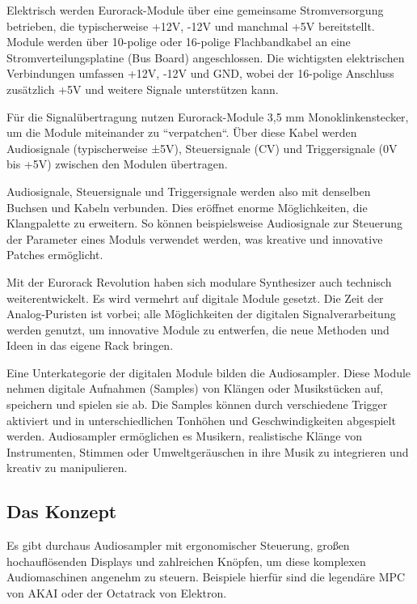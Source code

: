 	Elektrisch werden Eurorack-Module über eine gemeinsame Stromversorgung betrieben, die typischerweise +12V, -12V und manchmal +5V bereitstellt. Module werden über 10-polige oder 16-polige Flachbandkabel an eine Stromverteilungsplatine (Bus Board) angeschlossen. Die wichtigsten elektrischen Verbindungen umfassen +12V, -12V und GND, wobei der 16-polige Anschluss zusätzlich +5V und weitere Signale unterstützen kann. \cite{eurorack-standard}
	
	Für die Signalübertragung nutzen Eurorack-Module 3,5 mm Monoklinkenstecker, um die Module miteinander zu ``verpatchen``. Über diese Kabel werden Audiosignale (typischerweise ±5V), Steuersignale (CV) und Triggersignale (0V bis +5V) zwischen den Modulen übertragen.
	
	Audiosignale, Steuersignale und Triggersignale werden also mit denselben Buchsen und Kabeln verbunden.
	Dies eröffnet enorme Möglichkeiten, die Klangpalette zu erweitern. So können beispielsweise Audiosignale zur Steuerung der Parameter eines Moduls verwendet werden, was kreative und innovative Patches ermöglicht.
	
	Mit der Eurorack Revolution haben sich modulare Synthesizer auch technisch weiterentwickelt. 
	Es wird vermehrt auf digitale Module gesetzt. 
	Die Zeit der Analog-Puristen ist vorbei; alle Möglichkeiten der digitalen Signalverarbeitung werden genutzt, um innovative Module zu entwerfen, die neue Methoden und Ideen in das eigene Rack bringen.
	
	Eine Unterkategorie der digitalen Module bilden die Audiosampler. Diese Module nehmen digitale Aufnahmen (Samples) von Klängen oder Musikstücken auf, speichern und spielen sie ab. Die Samples können durch verschiedene Trigger aktiviert und in unterschiedlichen Tonhöhen und Geschwindigkeiten abgespielt werden. 
	Audiosampler ermöglichen es Musikern, realistische Klänge von Instrumenten, Stimmen oder Umweltgeräuschen in ihre Musik zu integrieren und kreativ zu manipulieren.
	
	
	
	\newpage
	\subsection{Das Konzept}
	
	Es gibt durchaus Audiosampler mit ergonomischer Steuerung, großen hochauflösenden Displays und zahlreichen Knöpfen, um diese komplexen Audiomaschinen angenehm zu steuern. 
	Beispiele hierfür sind die legendäre MPC von AKAI oder der Octatrack von Elektron. 
	
